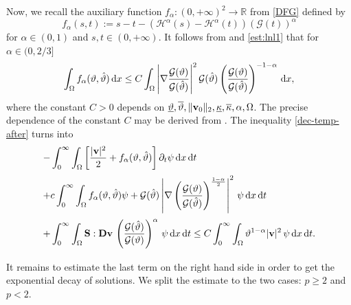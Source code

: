 \documentclass[11pt, a4paper, reqno]{amsart}
\newcommand{\R}{{\mathbb R}}
\numberwithin{equation}{section}
\newcommand{\thetah}{\hat\thet}
\newcommand{\vc}[1]{{\bf #1}}
\newcommand{\vv}{\vc{v}}
\newcommand{\thet}{\vartheta}
\renewcommand{\S}{\mathbf{S}}
\newcommand{\D}{\mathbf{D}}
\newcommand{\dt}{\,{\rm d} t }
\newcommand{\dx}{\,{\rm d} {x}}
\newcommand{\G}{\mathcal{G}}
\newcommand{\al}{\alpha}
\newcommand{\intnO}[1]{\int_0^{\infty}\intO{ #1 }\dt}
\newcommand{\intO}[1]{\int_{\Omega} #1 \dx}
\newcommand{\nm}[1]{\|#1\|}
\newcommand{\tmin}{\underline{\thet}}
\newcommand{\tmax}{\overline{\thet}}
\begin{document}
Now, we recall the auxiliary function $f_\alpha:(0,+\infty)^2\to\R$ from \eqref{DFG} defined by
\begin{equation}\label{definice}
f_\alpha(s,t):=s-t - (\mathcal{H}^\al(s) - \mathcal{H}^\al(t))(\G(t))^{\al}
\end{equation}
for $\alpha\in(0,1)$ and $s,t\in(0,+\infty)$. %
It follows from \cite[Lemma~3.1, Lemma 3.2,(3.31)]{AbBuKa2024} and \eqref{est:lnl1} that for $\alpha\in(0,2/3]$
\begin{equation}\label{Holder}
\begin{split}
\intO{f_\alpha(\thet,\thetah)}\le C\intO{\left| \nabla \frac{\G(\thet)}{\G(\thetah)} \right|^2  \G(\thetah) \left(\frac{\G(\thet)}{\G(\thetah)}\right)^{-1-\al}},
\end{split}
\end{equation}
where the constant $C>0$ depends on $\tmin, \tmax, \nm{\vv_0}_2,\underline{\kappa}, \overline{\kappa},\alpha, \Omega$. The precise dependence of the constant $C$ may be derived from \cite[(3.32)]{AbBuKa2024}.
The inequality \eqref{dec-temp-after} turns into
\begin{equation}\label{dec-temp-after1}
\begin{array}{l}\displaystyle\vspace{6pt}
 - \intnO{\left[\frac{|\vv|^2}{2}+f_\alpha(\thet,\thetah)\right]\partial_t\psi}
\\ \displaystyle\vspace{6pt}
+ c\intnO{ f_{\alpha}(\thet,\thetah)\psi+\G(\thetah) \left|\nabla\left(\frac{\G(\thet)}{\G(\thetah)}\right)^{\frac{1-\al}{2}}\right|^2 \,\psi} 
\\ \displaystyle\vspace{6pt}
 +  \intnO{  \S:\D{\vv}\,  \left(\frac{\G(\thetah)}{\G(\thet)}\right)^{\al} \,\psi}\leq C\intnO{\thet^{1-\al}|\vv|^2 \,\psi}.
\end{array}
\end{equation}
It remains to estimate the last term on the right hand side in order to get the exponential decay of solutions. We split the estimate to the two cases: $p\geq2$ and $p<2$.
\end{document}
